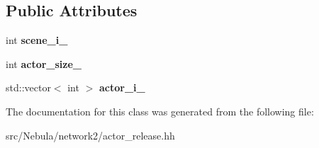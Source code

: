 \subsection*{\-Public \-Attributes}
\begin{DoxyCompactItemize}
\item 
\hypertarget{classneb_1_1packet_1_1actor__release_a93c67e65fd2391fa5788ea4df62dea83}{int {\bfseries scene\-\_\-i\-\_\-}}\label{classneb_1_1packet_1_1actor__release_a93c67e65fd2391fa5788ea4df62dea83}

\item 
\hypertarget{classneb_1_1packet_1_1actor__release_adb41a9a1ca585fc92c5811a086088fba}{int {\bfseries actor\-\_\-size\-\_\-}}\label{classneb_1_1packet_1_1actor__release_adb41a9a1ca585fc92c5811a086088fba}

\item 
\hypertarget{classneb_1_1packet_1_1actor__release_a38a61811df9631de91ded02972d2e23b}{std\-::vector$<$ int $>$ {\bfseries actor\-\_\-i\-\_\-}}\label{classneb_1_1packet_1_1actor__release_a38a61811df9631de91ded02972d2e23b}

\end{DoxyCompactItemize}


\-The documentation for this class was generated from the following file\-:\begin{DoxyCompactItemize}
\item 
src/\-Nebula/network2/actor\-\_\-release.\-hh\end{DoxyCompactItemize}
